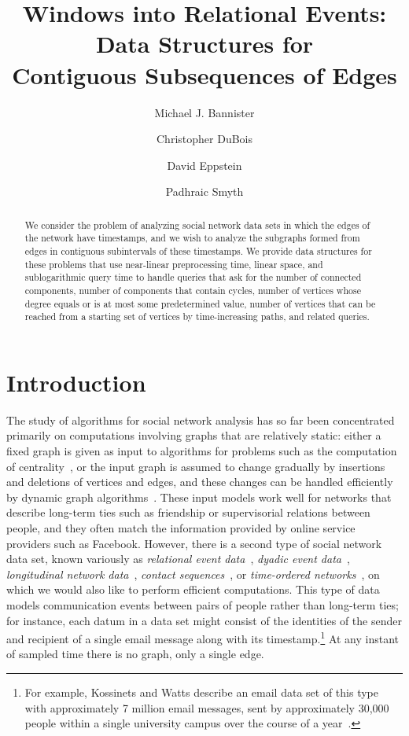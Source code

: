 \documentclass[11pt]{article}
\title{Windows into Relational Events:\\ Data Structures for\\ Contiguous Subsequences of Edges}
\author[1]{Michael J. Bannister}
\author[2]{Christopher DuBois}
\author[1]{David Eppstein}
\author[1]{Padhraic Smyth}
\affil[1]{Department of Computer Science, University of California, Irvine}
\affil[2]{Department of Statistics, University of California, Irvine}
\begin{document}
\maketitle
\begin{abstract}
We consider the problem of analyzing social network data sets in which the edges of the network have timestamps, and we wish to analyze the subgraphs formed from edges in contiguous subintervals of these timestamps. We provide data structures for these problems that use near-linear preprocessing time, linear space, and sublogarithmic query time to handle queries that ask for the number of connected components, number of components that contain cycles, number of vertices whose degree equals or is at most some predetermined value, number of vertices that can be reached from a starting set of vertices by time-increasing paths, and related queries.
\end{abstract}

\thispagestyle{empty}
\newpage
\setcounter{page}{1}
\pagestyle{plain}

\section{Introduction}
The study of algorithms for social network analysis has so far been concentrated primarily on computations involving graphs that are relatively static: either a fixed graph is given as input to algorithms for problems such as the computation of centrality~\cite{EppWan-SODA-01,Bra-JMS-01,OkaCheLi-FAW-08,Kin-08}, or the input graph is assumed to change gradually by insertions and deletions of vertices and edges, and these changes can be handled efficiently by dynamic graph algorithms~\cite{EppGalIta-ATCH-99,EppSpi-WADS-09,EppGooStr-COCOA-10}. These input models work well for networks that describe long-term ties such as friendship or supervisorial relations between people, and they often match the information provided by online service providers such as Facebook. However, there is a second type of social network data set, known variously as \emph{relational event data}~\cite{But-SM-08}, \emph{dyadic event data}~\cite{BraLerSni-ASONAM-09}, \emph{longitudinal network data}~\cite{GolZheFie-FTML-09,Noo-SN-11},  \emph{contact sequences}~\cite{Hol-PRE-05}, or \emph{time-ordered networks}~\cite{Moo-SF-02}, on which we would also like to perform efficient computations. This type of data models communication events between pairs of people rather than long-term ties; for instance, each datum in a data set might consist of the identities of the sender and recipient of a single email message along with its timestamp.\footnote{For example, Kossinets and Watts describe an email data set of this type with approximately 7 million email messages, sent by approximately 30,000 people within a single university campus over the course of a year~\cite{KosWat-AJS-09}.} At any instant of sampled time there is no graph, only a single edge.
\end{document}
